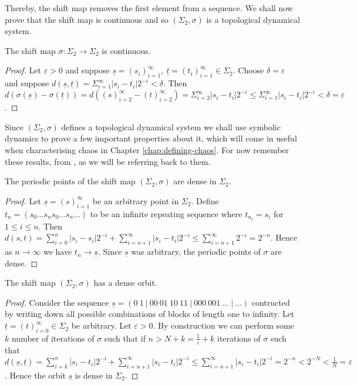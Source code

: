 Thereby, the shift map removes the first element from a sequence. We shall now prove that the shift map is continuous and so $(\Sigma_2, \sigma)$ is a topological dynamical system.

\begin{prop}
    The shift map $\sigma: \Sigma_2 \to \Sigma_2$ is continuous.
    \begin{proof}
        Let $\varepsilon > 0$ and suppose $\underline{s} = (s_i)_{i=1}^{\infty}, \ \underline{t} = (t_i)_{i=1}^{\infty} \in \Sigma_2$. Choose $\delta = \varepsilon$ and suppose $d(\underline{s}, \underline{t}) = \Sigma_{i=1}^{\infty}|s_i - t_i|2^{-i} < \delta$. Then $d\left( \sigma\left(\underline{s}\right) - \sigma\left(\underline{t}\right) \right) = d\left((s)_{i=2}^{\infty} - (t)_{i=2}^{\infty}\right) = \Sigma_{i=2}^{\infty}|s_i - t_i|2^{-i} \leq \Sigma_{i=1}^{\infty}|s_i - t_i|2^{-i} < \delta = \varepsilon$.
    \end{proof}
\end{prop}

Since $(\Sigma_2, \sigma)$ defines a topological dynamical system we shall use symbolic dynamics to prove a few important properties about it, which will come in useful when characterising chaos in Chapter \ref{chap:defining-chaos}. For now remember these results, from \cite[\S 1.6]{devaney}, as we will be referring back to them.

\begin{prop} \label{prop:shift-map-periodic-points-dense}
    The periodic points of the shift map $(\Sigma_2, \sigma)$ are dense in $\Sigma_2$.
    \begin{proof}
        Let $\underline{s} = (s)_{i=1}^{\infty}$ be an arbitrary point in $\Sigma_2$. Define $t_n = (s_0\dots s_ns_0\dots s_n\dots)$ to be an infinite repeating sequence where $t_{n_i} = s_i$ for $1 \leq i \leq n$. Then $d(s, t) = \sum_{i = 0}^n|s_i - s_i|2^{-i} + \sum_{i=n+1}^{\infty}|s_i - t_i|2^{-i} \leq \sum_{i = n+1}^{\infty}2^{-i} = 2^{-n}$. Hence as $n \to \infty$ we have $t_n \to \underline{s}$. Since $\underline{s}$ was arbitrary, the periodic points of $\sigma$ are dense.
    \end{proof}
\end{prop}

\begin{prop} \label{prop:shift-map-dense-orbit}
    The shift map $(\Sigma_2, \sigma)$ has a dense orbit.
    \begin{proof}
        Consider the sequence $\underline{s} = (0\ 1\ |\ 00\ 01\ 10\ 11\ |\ 000\ 001\ \dots\ |\ \dots)$ contructed by writing down all possible combinations of blocks of length one to infinity. Let $\underline{t} = (t)_{i=0}^{\infty} \in \Sigma_2$ be arbitrary. Let $\varepsilon > 0$. By construction we can perform some $k$ number of iterations of $\sigma$ such that if $n > N + k = \frac{1}{\varepsilon} + k$ iterations of $\sigma$ such that $d(\underline{s}, \underline{t}) = \sum_{i = k}^{n}|s_i - t_i|2^{-i} + \sum_{i = n+1}^{\infty}|s_i - t_i|2^{-i} \leq \sum_{i = n+1}^{\infty}|s_i - t_i|2^{-i} = 2^{-n} < 2^{-N} < \frac{1}{N} = \varepsilon$. Hence the orbit $\underline{s}$ is dense in $\Sigma_2$.
    \end{proof}
\end{prop}

